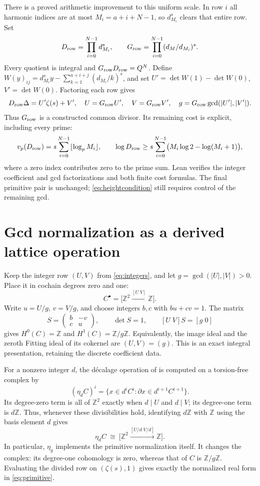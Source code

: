\documentclass[11pt]{article}
\newcommand{\Z}{\mathbb Z}
\begin{document}
There is a proved arithmetic improvement to this uniform scale. In row $i$
all harmonic indices are at most $M_i=a+i+N-1$, so $d_{M_i}^s$ clears
that entire row. Set
\begin{equation}
 D_{\rm row}=\prod_{i=0}^{N-1}d_{M_i}^{s},\qquad
 G_{\rm row}=\prod_{i=0}^{N-1}(d_M/d_{M_i})^s.
 \label{eq:rowcost}
\end{equation}
Every quotient is integral and $G_{\rm row}D_{\rm row}=Q^N$.
Define $W(y)_{ij}=d_{M_i}^s y-\sum_{k=1}^{a+i+j}(d_{M_i}/k)^s$, and set
$U'=\det W(1)-\det W(0)$, $V'=\det W(0)$. Factoring each row gives
\begin{equation}
 D_{\rm row}\Delta=U'\zeta(s)+V',\quad
 U=G_{\rm row}U',\quad V=G_{\rm row}V',\quad
 g=G_{\rm row}\gcd(|U'|,|V'|).
 \label{eq:rowfactor}
\end{equation}
Thus $G_{\rm row}$ is a constructed common divisor. Its remaining cost is
explicit, including every prime:
\[
 v_p(D_{\rm row})=s\sum_{i=0}^{N-1}\lfloor\log_p M_i\rfloor,
 \qquad
 \log D_{\rm row}\ge s\sum_{i=0}^{N-1}
     \bigl(M_i\log2-\log(M_i+1)\bigr),
\]
where a zero index contributes zero to the prime sum. Lean verifies the
integer coefficient and gcd factorizations and both finite cost formulas.
The final primitive pair is unchanged; \eqref{eq:heightcondition} still
requires control of the remaining gcd.

\section{Gcd normalization as a derived lattice operation}
Keep the integer row $(U,V)$ from \eqref{eq:integers}, and let
$g=\gcd(|U|,|V|)>0$. Place it in cochain degrees zero and one:
\[
 C^\bullet=\bigl[\Z^2\xrightarrow{[U\;V]}\Z\bigr].
\]
Write $u=U/g$, $v=V/g$, and choose integers $b,c$ with $bu+cv=1$.
The matrix
\[
 S=\begin{pmatrix}b&-v\\c&u\end{pmatrix},\qquad
 \det S=1,\qquad [U\;V]S=[g\;0]
\]
gives $H^0(C)=\Z$ and $H^1(C)=\Z/g\Z$. Equivalently, the image ideal
and the zeroth Fitting ideal of its cokernel are $(U,V)=(g)$.
This is an exact integral presentation, retaining the discrete coefficient data.

For a nonzero integer $d$, the d\'ecalage operation of \cite[Section 6]{BMS}
is computed on a torsion-free complex by
\[
 (\eta_d C)^i=\{x\in d^iC^i:\partial x\in d^{i+1}C^{i+1}\}.
\]
Its degree-zero term is all of $\Z^2$ exactly when $d\mid U$ and $d\mid V$;
its degree-one term is $d\Z$. Thus, whenever these divisibilities hold,
identifying $d\Z$ with $\Z$ using the basis element $d$ gives
\begin{equation}
 \eta_d C\ \cong\ \bigl[\Z^2\xrightarrow{[U/d\;V/d]}\Z\bigr].
 \label{eq:eta}
\end{equation}
In particular, $\eta_g$ implements the primitive normalization itself.
It changes the complex: its degree-one cohomology is zero, whereas that of
$C$ is $\Z/g\Z$. Evaluating the divided row on $(\zeta(s),1)$ gives exactly
the normalized real form in \eqref{eq:primitive}.
\end{document}
